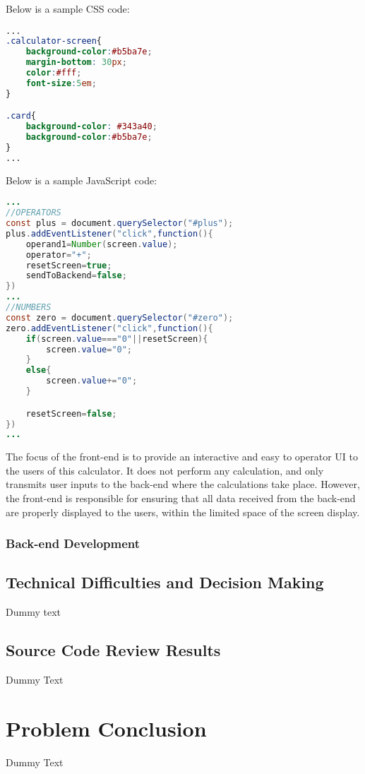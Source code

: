 \documentclass[12pt]{article}
\begin{document}
    \noindent Below is a sample CSS code:
    
    \begin{lstlisting}[language=CSS]
...
.calculator-screen{
    background-color:#b5ba7e;
    margin-bottom: 30px;
    color:#fff;
    font-size:5em;
}

.card{
    background-color: #343a40;
    background-color:#b5ba7e;
}
...
    \end{lstlisting}
    \noindent Below is a sample JavaScript code: 
    \begin{lstlisting}[language=Java]
...
//OPERATORS
const plus = document.querySelector("#plus");
plus.addEventListener("click",function(){
    operand1=Number(screen.value);
    operator="+";
    resetScreen=true;
    sendToBackend=false;
})
...
//NUMBERS
const zero = document.querySelector("#zero");
zero.addEventListener("click",function(){
    if(screen.value==="0"||resetScreen){
        screen.value="0";
    }
    else{
        screen.value+="0";
    }

    resetScreen=false;
})
...
    \end{lstlisting}

\noindent The focus of the front-end is to provide an interactive and easy to operator UI to the users of this calculator. It does not perform any calculation, and only transmits user inputs to the back-end where the calculations take place. However, the front-end is responsible for ensuring that all data received from the back-end are properly displayed to the users, within the limited space of the screen display. 

\subsubsection{Back-end Development}


\subsection{Technical Difficulties and Decision Making}
Dummy text

\subsection{Source Code Review Results}
Dummy Text

\section{Problem Conclusion}
Dummy Text
\end{document}

